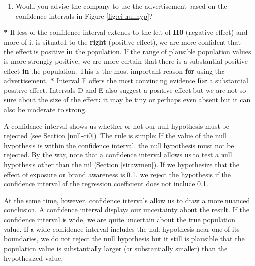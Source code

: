 \documentclass[a4paper]{book}
\newenvironment{Shaded}{\begin{snugshade}}{\end{snugshade}}
\newcommand{\KeywordTok}[1]{\textcolor[rgb]{0,0,0}{\textbf{#1}}}
\newcommand{\StringTok}[1]{\textcolor[rgb]{0.00,0.00,0.00}{#1}}
\newcommand{\ControlFlowTok}[1]{\textcolor[rgb]{0.00,0.00,0.00}{\textbf{#1}}}
\newcommand{\OperatorTok}[1]{\textcolor[rgb]{0.00,0.00,0.00}{\textbf{#1}}}
\newcommand{\NormalTok}[1]{#1}
\providecommand{\tightlist}{%
  \setlength{\itemsep}{0pt}\setlength{\parskip}{0pt}}
\theoremstyle{definition}
\theoremstyle{definition}
\theoremstyle{definition}
\theoremstyle{remark}
\begin{document}
\begin{enumerate}
\def\labelenumi{\arabic{enumi}.}
\setcounter{enumi}{1}
\tightlist
\item
  Would you advise the company to use the advertisement based on the
  confidence intervals in Figure \ref{fig:ci-nullhyp}?
\end{enumerate}

\begin{Shaded}
\begin{Highlighting}[]
\OperatorTok{*}\StringTok{ }\NormalTok{If less of the confidence interval extends to the left of }\KeywordTok{H0}\NormalTok{ (negative effect)}
\NormalTok{and more of it is situated to the }\KeywordTok{right}\NormalTok{ (positive effect), we are more}
\NormalTok{confident that the effect is positive }\ControlFlowTok{in}\NormalTok{ the population. If the range of}
\NormalTok{plausible population values is more strongly positive, we are more certain}
\NormalTok{that there is a substantial positive effect }\ControlFlowTok{in}\NormalTok{ the population. This is the}
\NormalTok{most important reason }\ControlFlowTok{for}\NormalTok{ using the advertisement.}
\OperatorTok{*}\StringTok{ }\NormalTok{Interval F offers the most convincing evidence }\ControlFlowTok{for}\NormalTok{ a substantial positive}
\NormalTok{effect. Intervals D and E also suggest a positive effect but we are not so}
\NormalTok{sure about the size of the effect}\OperatorTok{:}\StringTok{ }\NormalTok{it may be tiny or perhaps even absent but}
\NormalTok{it can also be moderate to strong.}
\end{Highlighting}
\end{Shaded}

A confidence interval shows us whether or not our null hypothesis must
be rejected (see Section \ref{null-ci0}). The rule is simple: If the
value of the null hypothesis is within the confidence interval, the null
hypothesis must not be rejected. By the way, note that a confidence
interval allows us to test a null hypothesis other than the nil (Section
\ref{strawmen}). If we hypothesize that the effect of exposure on brand
awareness is 0.1, we reject the hypothesis if the confidence interval of
the regression coefficient does not include 0.1.

At the same time, however, confidence intervals allow us to draw a more
nuanced conclusion. A confidence interval displays our uncertainty about
the result. If the confidence interval is wide, we are quite uncertain
about the true population value. If a wide confidence interval includes
the null hypothesis near one of its boundaries, we do not reject the
null hypothesis but it still is plausible that the population value is
substantially larger (or substantially smaller) than the hypothesized
value.
\end{document}
